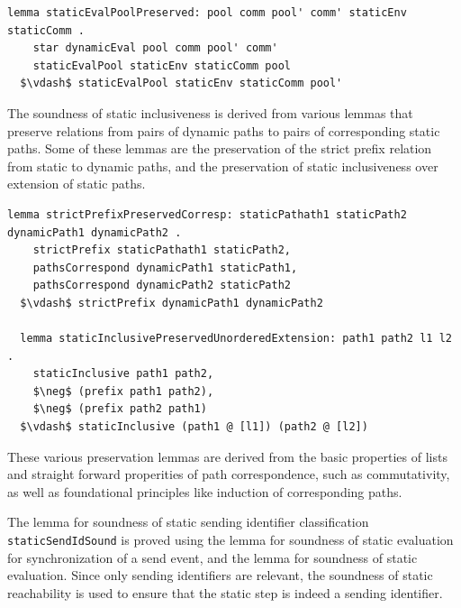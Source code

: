 \documentclass[letterpaper, 11pt]{report}
\begin{document}
\begin{lstlisting}[language=logic, mathescape]
  lemma staticEvalPoolPreserved: pool comm pool' comm' staticEnv staticComm .
    star dynamicEval pool comm pool' comm' 
    staticEvalPool staticEnv staticComm pool
  $\vdash$ staticEvalPool staticEnv staticComm pool'
\end{lstlisting}

The soundness of static inclusiveness is derived from various lemmas that
preserve relations from pairs of dynamic paths to pairs of corresponding static paths. 
Some of these lemmas are
the preservation of the strict prefix relation from static to dynamic paths,
and the preservation of static inclusiveness over extension of static paths.

\begin{lstlisting}[language=logic, mathescape]
  lemma strictPrefixPreservedCorresp: staticPathath1 staticPath2 dynamicPath1 dynamicPath2 .
    strictPrefix staticPathath1 staticPath2, 
    pathsCorrespond dynamicPath1 staticPath1,
    pathsCorrespond dynamicPath2 staticPath2
  $\vdash$ strictPrefix dynamicPath1 dynamicPath2

  lemma staticInclusivePreservedUnorderedExtension: path1 path2 l1 l2 .
    staticInclusive path1 path2, 
    $\neg$ (prefix path1 path2),
    $\neg$ (prefix path2 path1)
  $\vdash$ staticInclusive (path1 @ [l1]) (path2 @ [l2])
\end{lstlisting}

These various preservation lemmas are derived from the basic properties of lists 
and straight forward properities of path correspondence, such as commutativity, as
well as foundational principles like induction of corresponding paths.

The lemma for soundness of static sending identifier classification \lstinline{staticSendIdSound}
is proved using the lemma for soundness of static evaluation for synchronization of a send event,
and the lemma for soundness of static evaluation.
Since only sending identifiers are relevant,
the soundness of static reachability is
used to ensure that the static step is indeed a sending identifier. 
\end{document}
